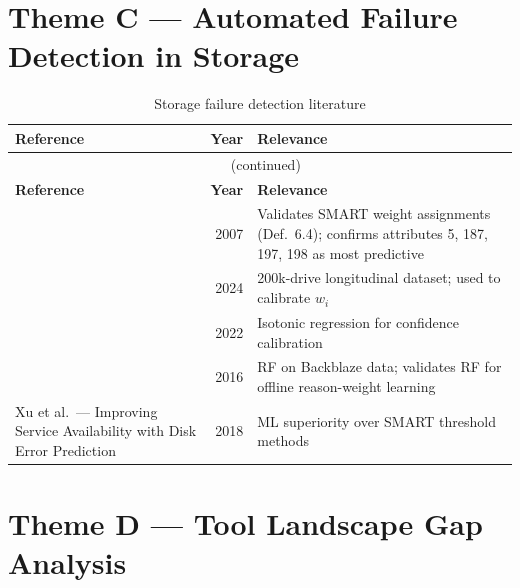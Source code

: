 \documentclass[11pt,a4paper]{report}
\begin{document}
\section{Theme C --- Automated Failure Detection in Storage}

\begin{longtable}{@{}p{5.5cm}rp{7cm}@{}}
\caption{Storage failure detection literature}\label{tab:themeC}\\
\toprule \textbf{Reference} & \textbf{Year} & \textbf{Relevance} \\ \midrule
\endfirsthead
\multicolumn{3}{c}{\tablename\ \thetable{} (continued)}\\ \toprule \textbf{Reference} & \textbf{Year} & \textbf{Relevance} \\ \midrule
\endhead
\citet{pinheiro2007} & 2007 & Validates SMART weight assignments (Def.~6.4); confirms attributes 5, 187, 197, 198 as most predictive \\
\citet{backblaze2024} & 2024 & 200k-drive longitudinal dataset; used to calibrate $w_i$ \\
\citet{murray2022} & 2022 & Isotonic regression for confidence calibration \\
\citet{botezatu2016} & 2016 & RF on Backblaze data; validates RF for offline reason-weight learning \\
Xu et al.\ --- Improving Service Availability with Disk Error Prediction & 2018 & ML superiority over SMART threshold methods \\
\bottomrule
\end{longtable}

\section{Theme D --- Tool Landscape Gap Analysis}
\end{document}
